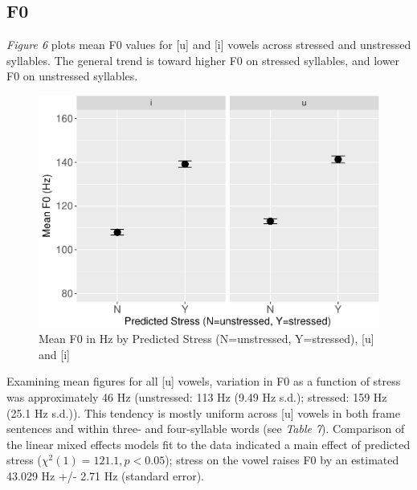 \documentclass[english,man]{apa6}
\theoremstyle{definition}
\theoremstyle{definition}
\theoremstyle{definition}
\theoremstyle{remark}
\begin{document}
\subsection{F0}\label{f0}

\textit{Figure 6} plots mean F0 values for {[}u{]} and {[}i{]} vowels
across stressed and unstressed syllables. The general trend is toward
higher F0 on stressed syllables, and lower F0 on unstressed syllables.

\begin{figure}
\centering
\includegraphics{lithuanian_article_files/figure-latex/Figure6-1.pdf}
\caption{\label{fig:Figure6}Mean F0 in Hz by Predicted Stress (N=unstressed,
Y=stressed), {[}u{]} and {[}i{]}}
\end{figure}

Examining mean figures for all {[}u{]} vowels, variation in F0 as a
function of stress was approximately 46 Hz (unstressed: 113 Hz (9.49 Hz
s.d.); stressed: 159 Hz (25.1 Hz s.d.)). This tendency is mostly uniform
across {[}u{]} vowels in both frame sentences and within three- and
four-syllable words (see \textit{Table 7}). Comparison of the linear
mixed effects models fit to the data indicated a main effect of
predicted stress (\(\chi^2(1) = 121.1, p < 0.05\)); stress on the vowel
raises F0 by an estimated 43.029 Hz +/- 2.71 Hz (standard error).
\end{document}
